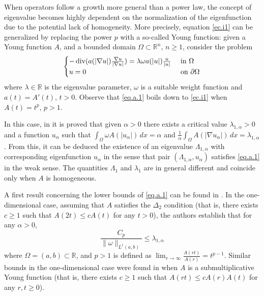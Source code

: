 \documentclass[12pt,reqno]{amsart}
\theoremstyle{definition}
\theoremstyle{remark}
\numberwithin{equation}{section}
\def\diver{\mathop{\text{\normalfont div}}}
\begin{document}
 

 

When operators follow a growth  more general than a power law, the concept of eigenvalue becomes highly dependent on the normalization of the eigenfunction due to the potential lack of homogeneity. More precisely, equation \eqref{ec.i1} can be generalized by replacing the power $p$ with a so-called Young function: given a Young function $A$, and a bounded domain $\Omega\subset \mathbb{R}^n$, $n\geq 1$, consider the problem
\begin{align} \label{eq.a.1}
\begin{cases}
-\diver(a(|\nabla u|) \frac{\nabla u}{|\nabla u|}) = \lambda \omega a(|u|)\frac{u}{|u|} & \text{ in } \Omega\\
u=0 &\text{ on } \partial\Omega
\end{cases}
\end{align}
where $\lambda\in \mathbb{R}$ is the eigenvalue parameter, $\omega$ is a suitable weight function and $a(t)=A'(t)$, $t>0$. Observe that \eqref{eq.a.1} boils down to \eqref{ec.i1} when $A(t)=t^p$, $p>1$.

\noindent In this case, in \cite{eig1, eig2} it is  proved that given $\alpha>0$ there exists a critical value $\lambda_{1,\alpha}>0$ and a function  $u_\alpha$ such that $\int_\Omega \omega A(|u_\alpha|)\,dx=\alpha$ and $\frac{1}{\alpha}\int_\Omega A(|\nabla u_\alpha|)\,dx = \lambda_{1,\alpha}$. From this, it can be deduced the existence of an eigenvalue $\Lambda_{1,\alpha}$ with corresponding eigenfunction $u_\alpha$ in the sense that pair $(\Lambda_{1,\alpha}, u_\alpha)$ satisfies \eqref{eq.a.1} in the weak sense. The quantities $\Lambda_1$ and $\lambda_1$ are in general different and coincide  only when $A$ is homogeneous. 
 
  
A first result concerning the lower bounds of \eqref{eq.a.1} can be found in \cite{pdnliapu}. In the one-dimensional case, assuming that $A$ satisfies the $\Delta_2$ condition (that is, there exists $c\geq 1$ such that $A(2t)\leq c A(t)$ for any $t>0$), the authors establish that for any $\alpha>0$,
$$
\frac{C_{p}}{\|\omega\|_{L^1(a,b)}}\leq \lambda_{1,\alpha} 
$$
where $\Omega=(a,b)\subset \mathbb{R}$, and $p>1$ is defined as $\lim_{r\to\infty}\frac{A(rt)}{A(r)}=t^{p-1}$. Similar bounds in the one-dimensional case were found in \cite{vergara} when $A$ is a  submultiplicative Young function (that is, there exists $c\geq 1$ such that $A(rt)\leq c A(r)A(t)$ for any $r,t\geq 0$).
\end{document}
